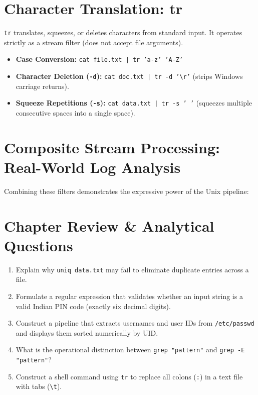 \section{Character Translation: tr}
\texttt{tr} translates, squeezes, or deletes characters from standard input. It operates strictly as a stream filter (does not accept file arguments).
\begin{itemize}[leftmargin=1.5em]
    \item \textbf{Case Conversion:} \texttt{cat file.txt | tr 'a-z' 'A-Z'}
    \item \textbf{Character Deletion (\texttt{-d}):} \texttt{cat doc.txt | tr -d '\textbackslash r'} (strips Windows carriage returns).
    \item \textbf{Squeeze Repetitions (\texttt{-s}):} \texttt{cat data.txt | tr -s ' '} (squeezes multiple consecutive spaces into a single space).
\end{itemize}

\section{Composite Stream Processing: Real-World Log Analysis}
Combining these filters demonstrates the expressive power of the Unix pipeline:

\section{Chapter Review \& Analytical Questions}
\begin{enumerate}[leftmargin=1.5em]
    \item Explain why \texttt{uniq data.txt} may fail to eliminate duplicate entries across a file.
    \item Formulate a regular expression that validates whether an input string is a valid Indian PIN code (exactly six decimal digits).
    \item Construct a pipeline that extracts usernames and user IDs from \texttt{/etc/passwd} and displays them sorted numerically by UID.
    \item What is the operational distinction between \texttt{grep "pattern"} and \texttt{grep -E "pattern"}?
    \item Construct a shell command using \texttt{tr} to replace all colons (\texttt{:}) in a text file with tabs (\texttt{\textbackslash t}).
\end{enumerate}
